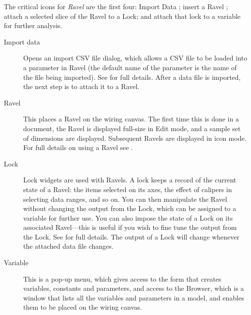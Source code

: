 The critical icons for \emph{Ravel} are the first four: Import Data
; insert a Ravel ;
attach a selected slice of the Ravel to a Lock; and attach that lock
to a variable for further analysis.
\begin{description}
\item [{Import data}]  Opens an import CSV
file dialog, which allows a CSV file to be loaded into a parameter
in Ravel (the default name of the parameter is the name of the file
being imported). See  for
full details. After a data file is imported, the next step is to attach
it to a Ravel.
\item [{Ravel}]  This places a Ravel on the
wiring canvas. The first time this is done in a document, the Ravel
is displayed full-size in Edit mode, and a sample set of dimensions
are displayed. Subsequent Ravels are displayed in icon mode. For full
details on using a Ravel see .
\item [{Lock}]  Lock widgets are used with
Ravels. A lock keeps a record of the current state of a Ravel: the
items selected on its axes, the effect of calipers in selecting data
ranges, and so on. You can then manipulate the Ravel without changing
the output from the Lock, which can be assigned to a variable for
further use. You can also impose the state of a Lock on its associated
Ravel---this is useful if you wish to fine tune the output from the
Lock. See  for full details. The output of a Lock will
change whenever the attached data file changes.
\item [{Variable}]  \label{Variable}
This is a pop-up menu, which gives access to the form that creates
variables, constants and parameters, and access to the Browser, which
is a window that lists all the variables and parameters in a model,
and enables them to be placed on the wiring canvas.


\end{description}

